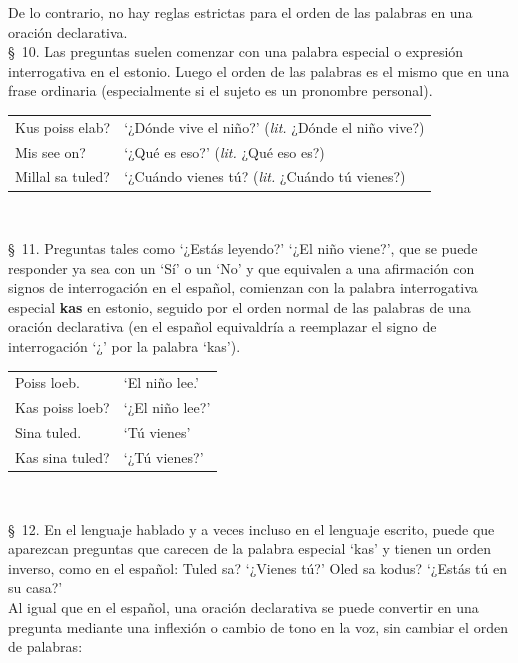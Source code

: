 De lo contrario, no hay reglas estrictas para el orden de las palabras en una oración declarativa.\\

\S\ 10. Las preguntas suelen comenzar con una palabra especial o expresión interrogativa en el estonio. Luego el orden de las palabras es el mismo que en una frase ordinaria (especialmente si el sujeto es un pronombre personal).

\begin{center}
\begin{tabular}{ l l }
	Kus poiss elab? 	& `¿Dónde vive el niño?' (\emph{lit.} ¿Dónde el niño vive?) \\
	Mis see on?			& `¿Qué es eso?' (\emph{lit.} ¿Qué eso es?) \\
	Millal sa tuled? 	& `¿Cuándo vienes tú? (\emph{lit.} ¿Cuándo tú vienes?)
\end{tabular}\\ \bigskip
\end{center}

\S\ 11. Preguntas tales como `¿Estás leyendo?' `¿El niño viene?', que se puede responder ya sea con un `Sí' o un `No' y que equivalen a una afirmación con signos de interrogación en el español, comienzan con la palabra interrogativa especial \textbf{kas} en estonio, seguido por el orden normal de las palabras de una oración declarativa (en el español equivaldría a reemplazar el signo de interrogación `¿' por la palabra `kas').

\begin{center}
\begin{tabular}{ l l }
	Poiss loeb. 	& `El niño lee.' \\
	Kas poiss loeb? & `¿El niño lee?' \\
	Sina tuled.		& `Tú vienes' \\
	Kas sina tuled?	& `¿Tú vienes?' 
\end{tabular}\\ \bigskip
\end{center}

\S\ 12. En el lenguaje hablado y a veces incluso en el lenguaje escrito, puede que aparezcan preguntas que carecen de la palabra especial `kas' y tienen un orden inverso, como en el español: Tuled sa? `¿Vienes tú?' Oled sa kodus? `¿Estás tú en su casa?'\\

Al igual que en el español, una oración declarativa se puede convertir en una pregunta mediante una inflexión o cambio de tono en la voz, sin cambiar el orden de palabras:

